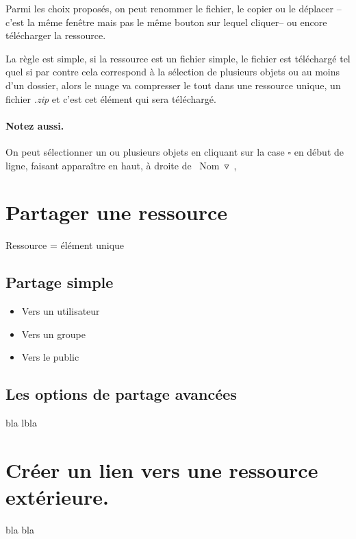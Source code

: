 Parmi les choix proposés, on peut renommer le fichier, le copier ou le déplacer --c'est la même fenêtre mais pas le même bouton sur lequel cliquer-- ou encore télécharger la ressource.

La règle est simple, si la ressource est un fichier simple, le fichier est téléchargé tel quel si par contre cela correspond à la sélection de plusieurs objets ou au moins d'un dossier, alors le nuage va compresser le tout dans une ressource unique, un fichier \emph{.zip} et c'est cet élément qui sera téléchargé.

\paragraph{Notez aussi.} 
On peut sélectionner un ou plusieurs objets en cliquant sur la case $\square$ en début de ligne, faisant apparaître en haut, à droite de \og~Nom~$\triangledown$~\fg{},

\section{Partager une ressource}

Ressource = élément unique

\subsection{Partage simple}

\begin{itemize}
    \item Vers un utilisateur
    \item Vers un groupe
    \item Vers le public 
\end{itemize}

\subsection{Les options de partage avancées}

bla lbla

\section{Créer un lien vers une ressource extérieure.}

bla bla

